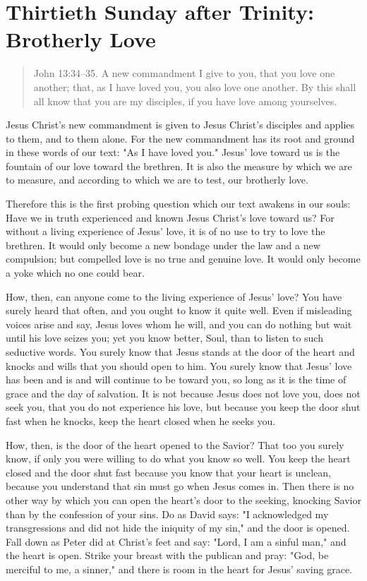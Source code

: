

\section{Thirtieth Sunday after Trinity: Brotherly Love}


\begin{quote}

John 13:34–35. A new commandment I give to you, that you love one another; that, as I have loved you, you also love one another. By this shall all know that you are my disciples, if you have love among yourselves.

\end{quote}

\bigskip

Jesus Christ’s new commandment is given to Jesus Christ’s disciples and applies to them, and to them alone. For the new commandment has its root and ground in these words of our text: "As I have loved you." Jesus’ love toward us is the fountain of our love toward the brethren. It is also the measure by which we are to measure, and according to which we are to test, our brotherly love.

Therefore this is the first probing question which our text awakens in our souls: Have we in truth experienced and known Jesus Christ’s love toward us? For without a living experience of Jesus’ love, it is of no use to try to love the brethren. It would only become a new bondage under the law and a new compulsion; but compelled love is no true and genuine love. It would only become a yoke which no one could bear.

How, then, can anyone come to the living experience of Jesus’ love? You have surely heard that often, and you ought to know it quite well. Even if misleading voices arise and say, Jesus loves whom he will, and you can do nothing but wait until his love seizes you; yet you know better, Soul, than to listen to such seductive words. You surely know that Jesus stands at the door of the heart and knocks and wills that you should open to him. You surely know that Jesus’ love has been and is and will continue to be toward you, so long as it is the time of grace and the day of salvation. It is not because Jesus does not love you, does not seek you, that you do not experience his love, but because you keep the door shut fast when he knocks, keep the heart closed when he seeks you.

How, then, is the door of the heart opened to the Savior? That too you surely know, if only you were willing to do what you know so well. You keep the heart closed and the door shut fast because you know that your heart is unclean, because you understand that sin must go when Jesus comes in. Then there is no other way by which you can open the heart’s door to the seeking, knocking Savior than by the confession of your sins. Do as David says: "I acknowledged my transgressions and did not hide the iniquity of my sin," and the door is opened. Fall down as Peter did at Christ’s feet and say: "Lord, I am a sinful man," and the heart is open. Strike your breast with the publican and pray: "God, be merciful to me, a sinner," and there is room in the heart for Jesus’ saving grace.

